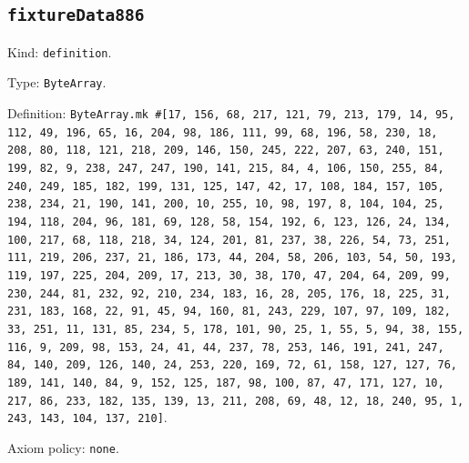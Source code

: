 \documentclass[11pt]{article}
\begin{document}
\subsection*{\texttt{fixtureData886}}
\noindent Kind: \texttt{definition}.\par
\noindent Type: \texttt{ByteArray}.\par
\noindent Definition: \texttt{ByteArray.mk \#[17, 156, 68, 217, 121, 79, 213, 179, 14, 95, 112, 49, 196, 65, 16, 204, 98, 186, 111, 99, 68, 196, 58, 230, 18, 208, 80, 118, 121, 218, 209, 146, 150, 245, 222, 207, 63, 240, 151, 199, 82, 9, 238, 247, 247, 190, 141, 215, 84, 4, 106, 150, 255, 84, 240, 249, 185, 182, 199, 131, 125, 147, 42, 17, 108, 184, 157, 105, 238, 234, 21, 190, 141, 200, 10, 255, 10, 98, 197, 8, 104, 104, 25, 194, 118, 204, 96, 181, 69, 128, 58, 154, 192, 6, 123, 126, 24, 134, 100, 217, 68, 118, 218, 34, 124, 201, 81, 237, 38, 226, 54, 73, 251, 111, 219, 206, 237, 21, 186, 173, 44, 204, 58, 206, 103, 54, 50, 193, 119, 197, 225, 204, 209, 17, 213, 30, 38, 170, 47, 204, 64, 209, 99, 230, 244, 81, 232, 92, 210, 234, 183, 16, 28, 205, 176, 18, 225, 31, 231, 183, 168, 22, 91, 45, 94, 160, 81, 243, 229, 107, 97, 109, 182, 33, 251, 11, 131, 85, 234, 5, 178, 101, 90, 25, 1, 55, 5, 94, 38, 155, 116, 9, 209, 98, 153, 24, 41, 44, 237, 78, 253, 146, 191, 241, 247, 84, 140, 209, 126, 140, 24, 253, 220, 169, 72, 61, 158, 127, 127, 76, 189, 141, 140, 84, 9, 152, 125, 187, 98, 100, 87, 47, 171, 127, 10, 217, 86, 233, 182, 135, 139, 13, 211, 208, 69, 48, 12, 18, 240, 95, 1, 243, 143, 104, 137, 210]}.\par
\noindent Axiom policy: \texttt{none}.\par
\end{document}
